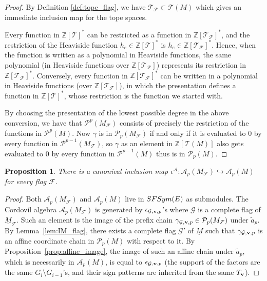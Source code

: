 \documentclass{amsart}
\newtheorem{proposition}[theorem]{Proposition}
\newcommand\Acal{{\mathcal A}}
\newcommand\Fcal{{\mathcal F}}
\newcommand\Gcal{{\mathcal G}}
\newcommand\Pcal{{\mathcal P}}
\newcommand\Tcal{{\mathcal T}}
\newcommand\vv{{\bf v}}
\newcommand\ZZ{{\mathbb Z}}
\begin{document}
{ \begin{proof}
By Definition \ref{def:tope_flag}, we have $\Tcal_{\Fcal} \subset \Tcal(M)$ which gives an immediate inclusion map for the tope spaces. 

Every function in $\ZZ[\Tcal]^*$ can be restricted as a function in $\ZZ[\Tcal_\Fcal]^*$, and the restriction of the Heaviside function $h_e\in\ZZ[\Tcal]^*$ is $h_e\in \ZZ[\Tcal_\Fcal]^*$. Hence, when the function is written as a polynomial in Heaviside functions, the same polynomial (in Heaviside functions over $\ZZ[\Tcal_\Fcal]$) represents its restriction in $\ZZ[\Tcal_\Fcal]^*$.
Conversely, every function in $\ZZ[\Tcal_\Fcal]^*$ can be written in a polynomial in Heaviside functions (over $\ZZ[\Tcal_\Fcal]$), in which the presentation defines a function in $\ZZ[\Tcal]^*$, whose restriction is the function we started with.

By choosing the presentation of the lowest possible degree in the above conversion, we have that $\Pcal^p(M_\Fcal)$ consists of precisely the restriction of the functions in $\Pcal^p(M)$. Now $\gamma$ is in $\Pcal_p(M_\Fcal)$ if and only if it is evaluated to 0 by every function in $\Pcal^{p-1}(M_\Fcal)$, so $\gamma$ as an element in $\ZZ[\Tcal(M)]$ also gets evaluated to 0 by every function in $\Pcal^{p-1}(M)$ thus is in $\Pcal_p(M)$.
\end{proof}
 
\begin{proposition} \label{prop:Cordovil_incl}
    There is a canonical inclusion map $\iota^{\Acal}:\Acal_p(M_\Fcal)\hookrightarrow \Acal_p(M)$ for every flag $\Fcal$.
\end{proposition}

\begin{proof}
Both $\Acal_p(M_{\Fcal})$ and $\Acal_p(M)$ live in ${\rm SFSym}(E)$ as submodules.
   The Cordovil algebra $\Acal_p(M_\Fcal)$ is generated by $\epsilon_{\Gcal,\vv,p}$'s where $\Gcal$ is a complete flag of $\underline{M}_\Fcal$. Such an element is the image of the prefix chain $\gamma_{\Gcal,\vv,p}\in\Pcal_p(M_\Fcal)$ under $\tilde{a}_p$. By Lemma~\ref{lem:IM_flag}, there exists a complete flag $\Gcal'$ of $\underline{M}$ such that $\gamma_{\Gcal,\vv,p}$ is an affine coordinate chain in $\Pcal_p(M)$ with respect to it. By Proposition~\ref{prop:affine_image}, the image of such an affine chain under $\tilde{a}_p$, which is necessarily in $\Acal_p(M)$, is equal to $\epsilon_{\Gcal,\vv,p}$ (the support of the factors are the same $G_i\setminus G_{i-1}$'s, and their sign patterns are inherited from the same $T_\vv$).
\end{proof}
}
\end{document}

